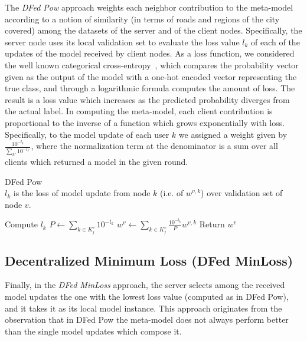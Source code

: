 \documentclass[conference]{IEEEtran}
\begin{document}
The \textit{DFed Pow} approach weights each neighbor contribution to the meta-model according to a notion of similarity (in terms of roads and regions of the city covered) among the datasets of the server and of the client nodes. Specifically, the server node uses its local validation set to evaluate the loss value $l_k$ of each of the updates of the model received by client nodes. As a loss function, we considered the well known categorical cross-entropy~\cite{cox1958regression}, which compares the probability vector given as the output of the model with a one-hot encoded vector representing the true class, and through a logarithmic formula computes the amount of loss. The result is a loss value which increases as the predicted probability diverges from the actual label.%
In computing the meta-model, each client contribution is proportional to the inverse of a function which grows exponentially with loss. Specifically, to the model update of each user $k$ we assigned a weight given by $\frac{10^{-l_k}}{\sum_{k'} 10^{-l_{k'}}}$, where the normalization term at the denominator is a sum over all clients which returned a model in the given round. %
%
\label{sec:DFedPow}
\begin{algorithm}[!h]
\small
\caption{DFed Pow\\
$l_k$ is the loss of model update from node $k$ (i.e. of $w^{v,k}$) over validation set of node $v$. }
\begin{algorithmic}
\label{mergFedPOW}
\State Compute $l_k$  
\State $P \gets \sum\limits_{k\in K^{v}_j}10^{-l_k}$
\State $ w^v \gets  \sum\limits_{k\in K^{v}_j} \frac{10^{-l_k}}{P}  w^{v,k} $
\EndFor
\State Return $w^{v}$
\EndFunction
\end{algorithmic}
\normalsize
\end{algorithm}
%
%
\vspace{-0.1in}
\subsection{Decentralized  Minimum Loss (DFed MinLoss)} 
Finally, in the \textit{DFed MinLoss} approach, the server selects among the received model updates the one with the lowest loss value (computed as in DFed Pow), and it takes it as its local model instance. This approach originates from the observation that in DFed Pow the meta-model does not always perform better than the single model updates which compose it.
\end{document}

